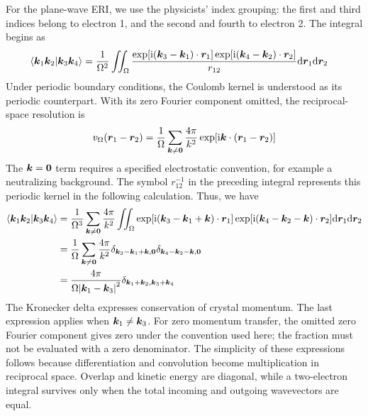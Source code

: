 For the plane-wave ERI, we use the physicists' index grouping:
the first and third indices belong to electron 1, and the second
and fourth to electron 2. The integral begins as
\begin{equation}
\begin{split}
  \braket{\boldsymbol{k}_1\boldsymbol{k}_2}{\boldsymbol{k}_3\boldsymbol{k}_4}
  &=\frac{1}{\Omega^2}\iint_\Omega
  \frac{\exp[\mathrm{i}(\boldsymbol{k}_3-\boldsymbol{k}_1)\cdot\boldsymbol{r}_1]
        \exp[\mathrm{i}(\boldsymbol{k}_4-\boldsymbol{k}_2)\cdot\boldsymbol{r}_2]}
       {r_{12}}\dd\boldsymbol{r}_1\dd\boldsymbol{r}_2
\end{split}
\end{equation}
Under periodic boundary conditions, the Coulomb kernel is understood as its
periodic counterpart. With its zero Fourier component omitted, the
reciprocal-space resolution is
\begin{equation}
  v_\Omega(\boldsymbol{r}_1-\boldsymbol{r}_2)=\frac{1}{\Omega}\sum_{\boldsymbol{k}\ne\boldsymbol{0}}
  \frac{4\pi}{k^2}\exp[\mathrm{i}\boldsymbol{k}\cdot(\boldsymbol{r}_1-\boldsymbol{r}_2)]
\end{equation}
The $\boldsymbol{k}=\boldsymbol{0}$ term requires a specified electrostatic convention, for
example a neutralizing background. The symbol $r_{12}^{-1}$ in the preceding
integral represents this periodic kernel in the following calculation.
Thus, we have
\begin{equation}
\begin{split}
  \braket{\boldsymbol{k}_1\boldsymbol{k}_2}{\boldsymbol{k}_3\boldsymbol{k}_4}
  &=\frac{1}{\Omega^3}\sum_{\boldsymbol{k}\ne\boldsymbol{0}}\frac{4\pi}{k^2}
  \iint_\Omega\exp[\mathrm{i}(\boldsymbol{k}_3-\boldsymbol{k}_1+\boldsymbol{k})\cdot\boldsymbol{r}_1]
  \exp[\mathrm{i}(\boldsymbol{k}_4-\boldsymbol{k}_2-\boldsymbol{k})\cdot\boldsymbol{r}_2]\dd\boldsymbol{r}_1\dd\boldsymbol{r}_2\\
  &=\frac{1}{\Omega}\sum_{\boldsymbol{k}\ne\boldsymbol{0}}\frac{4\pi}{k^2}
  \delta_{\boldsymbol{k}_3-\boldsymbol{k}_1+\boldsymbol{k},\boldsymbol{0}}
  \delta_{\boldsymbol{k}_4-\boldsymbol{k}_2-\boldsymbol{k},\boldsymbol{0}}\\
  &=\frac{4\pi}{\Omega\abs{\boldsymbol{k}_1-\boldsymbol{k}_3}^2}
  \delta_{\boldsymbol{k}_1+\boldsymbol{k}_2,\boldsymbol{k}_3+\boldsymbol{k}_4}
\end{split}
\end{equation}
The Kronecker delta expresses conservation of crystal momentum.
The last expression applies when $\boldsymbol{k}_1\ne\boldsymbol{k}_3$. For zero momentum
transfer, the omitted zero Fourier component gives zero under the convention
used here; the fraction must not be evaluated with a zero denominator.
The simplicity of these expressions follows because differentiation and
convolution become multiplication in reciprocal space. Overlap and kinetic
energy are diagonal, while a two-electron integral survives only when the
total incoming and outgoing wavevectors are equal.

